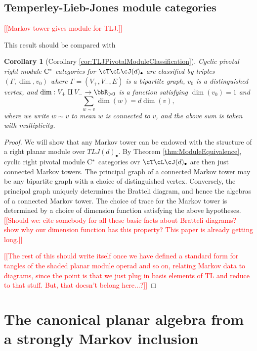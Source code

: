\documentclass[11pt]{article}
\theoremstyle{plain}
\newtheorem*{cor*}{Corollary}
\theoremstyle{definition}
\newcommand{\Cstar}{\rm{C^*}}
\newcommand{\nn}[1]{\textcolor{red}{[[#1]]}}
\begin{document}
\subsection{Temperley-Lieb-Jones module categories} 
\label{sec:TLJmodules}


\nn{Markov tower gives module for TLJ.}

This result should be compared with \cite{MR3420332} 

\begin{cor*}[Corollary \ref{cor:TLJPivotalModuleClassification}]
Cyclic pivotal right module $\Cstar$ categories for $\cT\cL\cJ(d)_\bullet$ are classified by triples $(\Gamma, \dim, v_0)$ where $\Gamma=(V_+, V_- , E)$ is a bipartite graph, $v_0$ is a distinguished vertex, and $\dim : V_+\amalg V_- \to \bbR_{>0}$ is a function satisfying $\dim(v_0) = 1$ and
$$
\sum_{w\sim v} \dim(w) = d \dim(v),
$$
where we write $w\sim v$ to mean $w$ is connected to $v$, and the above sum is taken with multiplicity.
\end{cor*}
\begin{proof}
	We will show that any Markov tower can be endowed with the structure of a right planar module over $TLJ(d)_\bullet$. By Theorem \ref{thm:ModuleEquivalence}, cyclic right pivotal module $\Cstar$ categories ovr $\cT\cL\cJ(d)_\bullet$ are then just connected Markov towers. The principal graph of a connected Markov tower may be any bipartite graph with a choice of distinguished vertex. Conversely, the principal graph uniquely determines the Bratteli diagram, and hence the algebras of a connected Markov tower. The choice of trace for the Markov tower is determined by a choice of dimension function satisfying the above hypotheses. \nn{Should we: cite somebody for all these basic facts about Bratteli diagrams? show why our dimension function has this property? This paper is already getting long.}

	\nn{The rest of this should write itself once we have defined a standard form for tangles of the shaded planar module operad and so on, relating Markov data to diagrams, since the point is that we just plug in basis elements of TL and reduce to that stuff. But, that doesn't belong here...?}
\end{proof}



\section{The canonical planar algebra from a strongly Markov inclusion} 
\end{document}
